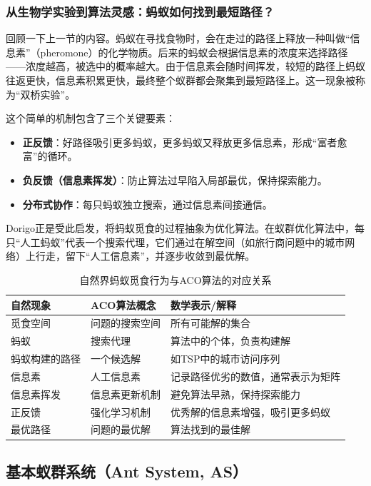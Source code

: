 \documentclass[lang=cn,zihao=-4,a4paper,fontset=windows]{beautybook}
\begin{document}
\subsubsection{从生物学实验到算法灵感：蚂蚁如何找到最短路径？}

回顾一下上一节的内容。蚂蚁在寻找食物时，会在走过的路径上释放一种叫做“信息素”（pheromone）的化学物质。后来的蚂蚁会根据信息素的浓度来选择路径——浓度越高，被选中的概率越大。由于信息素会随时间挥发，较短的路径上蚂蚁往返更快，信息素积累更快，最终整个蚁群都会聚集到最短路径上。这一现象被称为“双桥实验”。

这个简单的机制包含了三个关键要素：
\begin{itemize}
    \item \textbf{正反馈}：好路径吸引更多蚂蚁，更多蚂蚁又释放更多信息素，形成“富者愈富”的循环。
    \item \textbf{负反馈（信息素挥发）}：防止算法过早陷入局部最优，保持探索能力。
    \item \textbf{分布式协作}：每只蚂蚁独立搜索，通过信息素间接通信。
\end{itemize}

Dorigo正是受此启发，将蚂蚁觅食的过程抽象为优化算法。在蚁群优化算法中，每只“人工蚂蚁”代表一个搜索代理，它们通过在解空间（如旅行商问题中的城市网络）上行走，留下“人工信息素”，并逐步收敛到最优解。

\begin{table}[h]
\centering
\caption{自然界蚂蚁觅食行为与ACO算法的对应关系}
\begin{tabular}{p{}p{}p{}}
\toprule
\textbf{自然现象} & \textbf{ACO算法概念} & \textbf{数学表示/解释} \\
\midrule
觅食空间 & 问题的搜索空间 & 所有可能解的集合 \\
\hline
蚂蚁 & 搜索代理 & 算法中的个体，负责构建解 \\
\hline
蚂蚁构建的路径 & 一个候选解 & 如TSP中的城市访问序列 \\
\hline
信息素 & 人工信息素 & 记录路径优劣的数值，通常表示为矩阵 \\
\hline
信息素挥发 & 信息素更新机制 & 避免算法早熟，保持探索能力 \\
\hline
正反馈 & 强化学习机制 & 优秀解的信息素增强，吸引更多蚂蚁 \\
\hline
最优路径 & 问题的最优解 & 算法找到的最佳解 \\
\bottomrule
\end{tabular}
\end{table}


\subsection{基本蚁群系统（Ant System, AS）}
\end{document}
